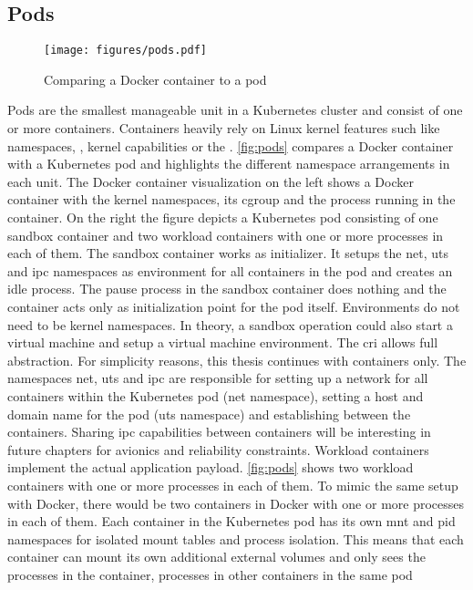 \documentclass[titlepage]{report}
\begin{document}
\subsection{Pods}\label{subsection:pods}
\begin{figure}[H]
    \centering
    \texttt{[image: figures/pods.pdf]}
    \caption{Comparing a Docker container to a pod\cite{DockerAndPods}}\label{fig:pods}
\end{figure}
Pods are the smallest manageable unit in a Kubernetes cluster and consist of one or more containers. Containers heavily rely on Linux kernel features such like namespaces, , kernel capabilities
or the . \autoref{fig:pods} compares a Docker container with a Kubernetes pod and highlights the different namespace arrangements in each unit. The Docker container visualization on the left
shows a Docker container with the kernel namespaces, its cgroup and the process running in the container. On the right the figure depicts a Kubernetes pod consisting of one sandbox container and two workload
containers with one or more processes in each of them. The sandbox container works as initializer. It setups the net, uts and ipc namespaces as environment for all containers in the pod and creates an idle process.
The pause process in the sandbox container does nothing\cite{KubernetesPauseContainer} and the container acts only as initialization point for the pod itself. Environments do not need to be kernel namespaces.
In theory, a sandbox  operation could also start a virtual machine and setup a virtual machine environment\cite{KubernetesSandbox}. The \gls{cri} allows full abstraction. For simplicity reasons, this thesis continues with
containers only. The namespaces net, uts and ipc are responsible for setting up a network for all containers within the Kubernetes pod (net namespace), setting a host and domain name for the pod (uts namespace) and establishing 
between the containers. Sharing \gls{ipc} capabilities between containers will be interesting in future chapters for avionics and reliability constraints. Workload containers implement the actual application payload. \autoref{fig:pods} shows
two workload containers with one or more processes in each of them. To mimic the same setup with Docker, there would be two containers in Docker with one or more processes in each of them. Each container in the Kubernetes pod
has its own mnt and pid namespaces for isolated mount tables and process isolation. This means that each container can mount its own additional external volumes and only sees the processes in the container, processes in other containers in the same pod
\end{document}

